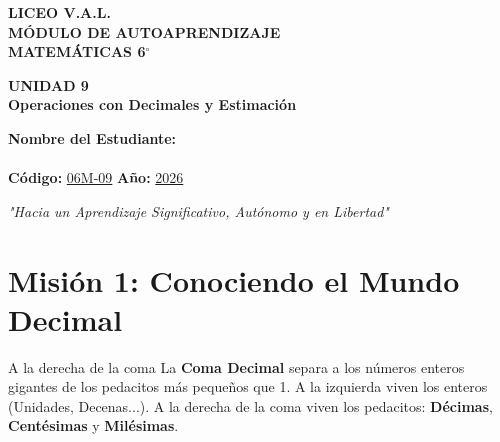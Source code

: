 \documentclass[12pt, letterpaper]{article}
\newcommand{\titulounidad}[2]{
	\begin{tcolorbox}[colback=valblue!10, colframe=valblue, arc=3mm, boxrule=1.5pt]
		\centering \Huge \textbf{UNIDAD #1}\\[0.2cm]
		\Large \textbf{#2}
	\end{tcolorbox}
	\vspace{0.5cm}
}
\begin{document}
	
	\begin{center}
		\vspace*{1cm}
		{\Huge \textbf{LICEO V.A.L.}}\\[0.5cm]
		{\LARGE \textbf{MÓDULO DE AUTOAPRENDIZAJE}}\\[0.5cm]
		{\Large \textbf{MATEMÁTICAS 6$^\circ$}}\\[0.5cm]
		
		\titulounidad{9}{Operaciones con Decimales y Estimación}
		
		\vspace{0.4cm}
		\begin{tcolorbox}[colback=white, colframe=valblue, width=12cm, arc=3mm, boxrule=1.5pt]
			\centering
			\vspace{0.3cm}
			\textbf{Nombre del Estudiante:}\\[0.3cm]
			\underline{\hspace{9cm}}\\[0.5cm]
			\textbf{Código:} \underline{06M-09} \hspace{1cm} \textbf{Año:} \underline{2026}
			\vspace{0.3cm}
		\end{tcolorbox}
		
		\vspace{0.8cm}
		\textit{"Hacia un Aprendizaje Significativo, Autónomo y en Libertad"}
	\end{center}
	
	
	\section*{Misión 1: Conociendo el Mundo Decimal}
	
	\begin{concepto}{A la derecha de la coma}
		La \textbf{Coma Decimal} separa a los números enteros gigantes de los pedacitos más pequeños que 1. A la izquierda viven los enteros (Unidades, Decenas...). A la derecha de la coma viven los pedacitos: \textbf{Décimas}, \textbf{Centésimas} y \textbf{Milésimas}.
	\end{concepto}
	
\end{document}
